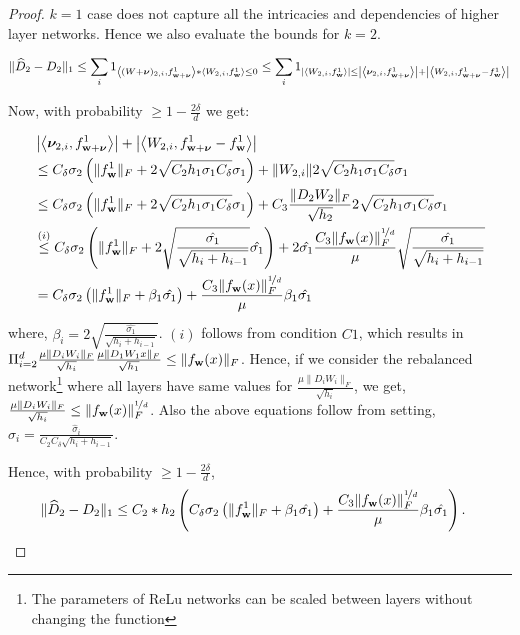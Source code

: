 \documentclass{article}
\begin{document}
\begin{proof}
$k=1$ case does not capture all the intricacies and dependencies of higher layer networks. Hence we also evaluate the bounds for $k=2$.

\begin{align*}
\|\widehat{D}_2 - D_2\|_1 \leq \sum_i 1_{\left\langle (W+\boldsymbol{\nu})_{2,i}, f^1_{\mathbf{w}+\boldsymbol{\nu}} \right\rangle*\left\langle W_{2,i}, f^1_{\mathbf{w}} \right\rangle \leq 0 } \leq \sum_i 1_{\left\lvert{\left\langle W_{2,i}, f^1_{\mathbf{w}} \right\rangle}\right\rvert \leq \left\lvert{\left\langle \boldsymbol{\nu}_{2,i}, f^1_{\mathbf{w}+\boldsymbol{\nu}} \right\rangle}\right\rvert + \left\lvert{\left\langle W_{2,i}, f^1_{\mathbf{w}+\boldsymbol{\nu}}-f^1_{\mathbf{w}} \right\rangle}\right\rvert }
\end{align*}

Now, with probability $\geq 1-\frac{2\delta}{d}$ we get:

\begin{align*}
&\left\lvert{\left\langle \boldsymbol{\nu}_{2,i}, f^1_{\mathbf{w}+\boldsymbol{\nu}} \right\rangle}\right\rvert + \left\lvert{\left\langle W_{2,i}, f^1_{\mathbf{w}+\boldsymbol{\nu}}-f^1_{\mathbf{w}} \right\rangle}\right\rvert \\ &\leq C_{\delta} \sigma_2 \left( \|f^1_{\mathbf{w}}\|_F+ 2 \sqrt{C_2 h_1 \sigma_1 C_{\delta}} \sigma_1 \right) + \|W_{2, i}\| 2 \sqrt{C_2 h_1 \sigma_1 C_{\delta}} \sigma_1 \\
&\leq  C_{\delta} \sigma_2 \left( \|f^1_{\mathbf{w}}\|_F + 2 \sqrt{C_2 h_1 \sigma_1 C_{\delta}} \sigma_1   \right) + C_3 \frac{\|D_2 W_2\|_F}{\sqrt{h_2}} 2 \sqrt{C_2 h_1 \sigma_1 C_{\delta}} \sigma_1   \\
& \stackrel{(i)}{\leq} C_{\delta} \sigma_2 \left(\|f^1_{\mathbf{w}}\|_F  + 2 \sqrt{\frac{\hat{\sigma_1}}{\sqrt{h_i + h_{i-1}}}} \hat{\sigma_1} \right) + 2 \hat{\sigma_1}  \frac{C_3  \|f_{\mathbf{w}}(x)\|_F^{\nicefrac{1}{d}}}{\mu} \sqrt{\frac{\hat{\sigma_1}}{\sqrt{h_i + h_{i-1}}}}\\
&=C_{\delta} \sigma_2 \left( \|f^1_{\mathbf{w}}\|_F + \beta_1 \hat{\sigma_1} \right) +  \frac{C_3  \|f_{\mathbf{w}}(x)\|_F^{\nicefrac{1}{d}}}{\mu} \beta_1 \hat{\sigma_1} 
\end{align*}
where, $\beta_i = 2 \sqrt{\frac{\hat{\sigma_1}}{\sqrt{h_i + h_{i-1}}}}$. $(i)$ follows from condition $C1$, which results in $\Pi_{i=2}^d \frac{\mu \|D_i W_i\|_F}{\sqrt{h_i}} \frac{\mu \|D_1 W_1 x\|_F}{\sqrt{h_1}} \leq \|f_{\mathbf{w}}(x)\|_F$. Hence, if we consider the rebalanced network\footnote{The parameters of ReLu networks can be scaled between layers without changing the function} where all layers have same values for $\frac{\mu \|D_i W_i\|_F}{\sqrt{h_i}} $, we get, $\frac{\mu \|D_i W_i\|_F}{\sqrt{h_i}} \leq \|f_{\mathbf{w}}(x)\|_F^{\nicefrac{1}{d}}$. Also the above equations follow from setting, $\sigma_i =\frac{\hat{\sigma}_i}{C_2 C_{\delta}\sqrt{h_i + h_{i-1}}}$. 

Hence, with probability $\geq 1-\frac{2\delta}{d}$,
\begin{align*}
\|\widehat{D}_2 - D_2\|_1 &\leq C_2*h_2 \left( C_{\delta} \sigma_2 \left( \|f^1_{\mathbf{w}}\|_F + \beta_1 \hat{\sigma_1} \right) +  \frac{C_3  \|f_{\mathbf{w}}(x)\|_F^{\nicefrac{1}{d}}}{\mu}\beta_1 \hat{\sigma_1} \right).
\end{align*}


\end{proof}
\end{document}
